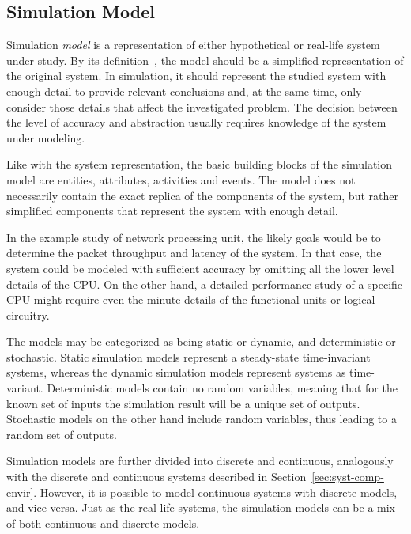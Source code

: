 \subsection{Simulation Model}
\label{sec:simulation-model}

Simulation \emph{model} is a representation of either hypothetical or real-life system under study. By its definition~\cite{Encyclopedia of computer science}, the model should be a simplified representation of the original system. In simulation, it should represent the studied system with enough detail to provide relevant conclusions and, at the same time, only consider those details that affect the investigated problem. The decision between the level of accuracy and abstraction usually requires knowledge of the system under modeling.~\cite{Banks:2010:DES}

Like with the system representation, the basic building blocks of the simulation model are entities, attributes, activities and events. The model does not necessarily contain the exact replica of the components of the system, but rather simplified components that represent the system with enough detail.~\cite{Banks:2010:DES}

In the example study of network processing unit, the likely goals would be to determine the packet throughput and latency of the system. In that case, the system could be modeled with sufficient accuracy by omitting all the lower level details of the CPU. On the other hand, a detailed performance study of a specific CPU might require even the minute details of the functional units or logical circuitry.~\cite{Magnusson:2002:Simics, Hughes:2002:Rsim}

The models may be categorized as being static or dynamic, and deterministic or stochastic. Static simulation models represent a steady-state time-invariant systems, whereas the dynamic simulation models represent systems as time-variant. Deterministic models contain no random variables, meaning that for the known set of inputs the simulation result will be a unique set of outputs. Stochastic models on the other hand include random variables, thus leading to a random set of outputs.~\cite{Banks:2010:DES}

Simulation models are further divided into discrete and continuous, analogously with the discrete and continuous systems described in Section~\ref{sec:syst-comp-envir}. However, it is possible to model continuous systems with discrete models, and vice versa. Just as the real-life systems, the simulation models can be a mix of both continuous and discrete models.~\cite{Banks:2010:DES}

